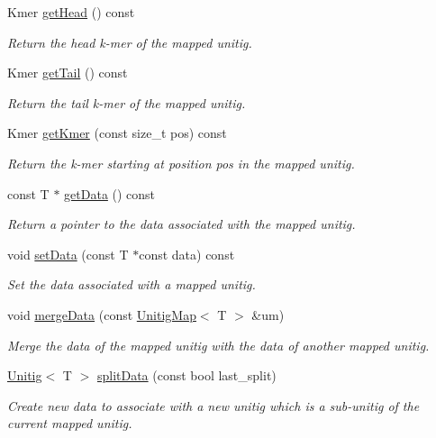 \begin{DoxyCompactItemize}
Kmer \hyperlink{structUnitigMap_a0abb8766ed68fdade6aa6d9d5ea201f3}{get\+Head} () const
\begin{DoxyCompactList}\small\item\em Return the head k-\/mer of the mapped unitig. \end{DoxyCompactList}\item 
Kmer \hyperlink{structUnitigMap_a1254c81e7d2541c5aa9cfd4e2ba9f021}{get\+Tail} () const
\begin{DoxyCompactList}\small\item\em Return the tail k-\/mer of the mapped unitig. \end{DoxyCompactList}\item 
Kmer \hyperlink{structUnitigMap_a90042b7d8610cd1726b19c3a49e7be26}{get\+Kmer} (const size\+\_\+t pos) const
\begin{DoxyCompactList}\small\item\em Return the k-\/mer starting at position pos in the mapped unitig. \end{DoxyCompactList}\item 
const T $\ast$ \hyperlink{structUnitigMap_a35643b0843f2b0ff5da8c2a40612c8fc}{get\+Data} () const
\begin{DoxyCompactList}\small\item\em Return a pointer to the data associated with the mapped unitig. \end{DoxyCompactList}\item 
void \hyperlink{structUnitigMap_a1a300d64047cfab14783746c407fe41c}{set\+Data} (const T $\ast$const data) const
\begin{DoxyCompactList}\small\item\em Set the data associated with a mapped unitig. \end{DoxyCompactList}\item 
void \hyperlink{structUnitigMap_ade45565864206eece29f34415347c2f9}{merge\+Data} (const \hyperlink{structUnitigMap}{Unitig\+Map}$<$ T $>$ \&um)
\begin{DoxyCompactList}\small\item\em Merge the data of the mapped unitig with the data of another mapped unitig. \end{DoxyCompactList}\item 
\hyperlink{classUnitig}{Unitig}$<$ T $>$ \hyperlink{structUnitigMap_a3b3699727329217e346fadf2d8a987a6}{split\+Data} (const bool last\+\_\+split)
\begin{DoxyCompactList}\small\item\em Create new data to associate with a new unitig which is a sub-\/unitig of the current mapped unitig. \end{DoxyCompactList}\item 

\end{DoxyCompactItemize}
